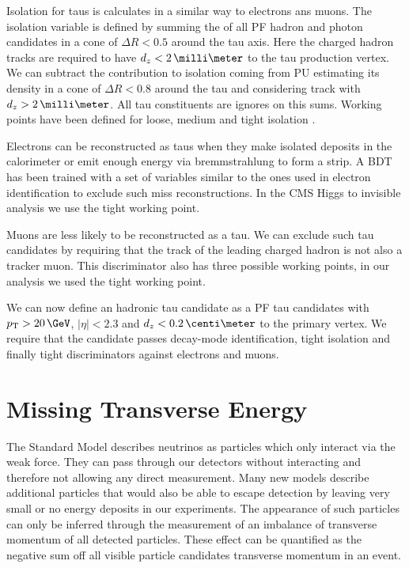 Isolation for taus is calculates in a similar way to electrons ans muons. The isolation variable is defined by summing the \pt of all \gls{PF} hadron and photon candidates in a cone of $\Delta R < 0.5$ around the tau axis. Here the charged hadron tracks are required to have $d_z < 2\,\milli\meter$ to the tau production vertex. We can subtract the contribution to isolation coming from \gls{PU} estimating its density in a cone of $\Delta R < 0.8$ around the tau and considering track with $d_z > 2\,\milli\meter$. All tau constituents are ignores on this sums. Working points have been defined for loose, medium and tight isolation \cite{ARTICLE:CMSReconstructionIndentificationTau}. 

Electrons can be reconstructed as taus when they make isolated deposits in the calorimeter or emit enough energy via bremmstrahlung to form a strip. A \gls{BDT} has been trained with a set of variables similar to the ones used in electron identification to exclude such miss reconstructions. In the \gls{CMS} Higgs to invisible analysis we use the tight working point.

Muons are less likely to be reconstructed as a tau. We can exclude such tau candidates by requiring that the track of the leading charged hadron is not also a tracker muon. This discriminator also has three possible working points, in our analysis we used the tight working point.

We can now define an hadronic tau candidate as a \gls{PF} tau candidates with $\pt > 20 \,\GeV$, $|\eta|<2.3$ and $d_z<0.2 \,\centi\meter$ to the primary vertex. We require that the candidate passes decay-mode identification, tight isolation and finally tight discriminators against electrons and muons.

\section{Missing Transverse Energy}
\label{SECTION:EventReconstructionAndSimulation_MET}


The Standard Model describes neutrinos as particles which only interact via the weak force. They can pass through our detectors without interacting and therefore not allowing any direct measurement. Many new models describe additional particles that would also be able to escape detection by leaving very small or no energy deposits in our experiments. The appearance of such particles can only be inferred through the measurement of an imbalance of transverse momentum of all detected particles. These effect can be quantified as the negative sum off all visible particle candidates transverse momentum in an event. 

